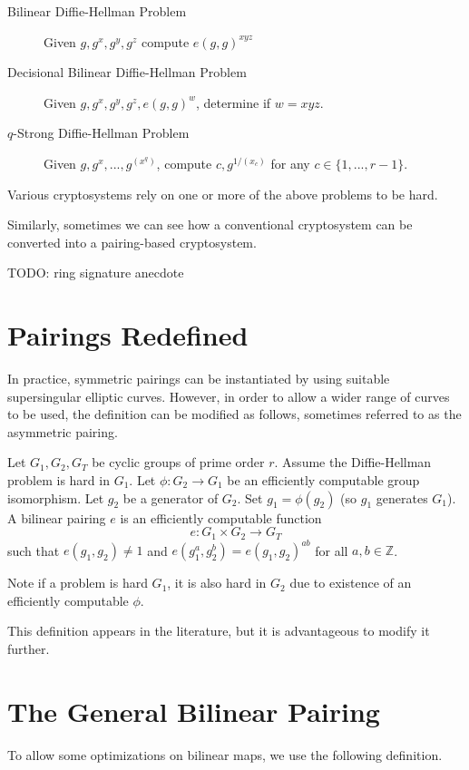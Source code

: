 \begin{description}
\item [Bilinear Diffie-Hellman Problem]
Given $g,g^x,g^y,g^z$ compute $e(g,g)^{xyz}$
\item [Decisional Bilinear Diffie-Hellman Problem]
Given $g,g^x,g^y,g^z,e(g,g)^w$, determine if $w = x y z$.
\item [$q$-Strong Diffie-Hellman Problem]
Given $g,g^x,...,g^{(x^q)}$, compute $c, g^{1/(x_c)}$
for any $c\in\{1,...,r-1\}$.
\end{description}

Various cryptosystems rely on one or more of the above problems to be
hard.

Similarly, sometimes we can see how a conventional cryptosystem
can be converted into a pairing-based cryptosystem.

TODO: ring signature anecdote

\section{Pairings Redefined}

In practice, symmetric pairings can be instantiated by
using suitable supersingular elliptic curves.
However, in order to allow a wider range of curves to be used,
the definition can be modified as follows, sometimes referred
to as the asymmetric pairing.

Let $G_1, G_2, G_T$ be cyclic groups of prime order $r$.
Assume the Diffie-Hellman problem is hard in $G_1$.
Let $\phi : G_2 \rightarrow G_1$ be an efficiently computable group
isomorphism. Let $g_2$ be a generator of $G_2$.
Set $g_1 = \phi(g_2)$ (so $g_1$ generates $G_1$). 
A bilinear pairing $e$ is an efficiently computable function
\[
e:G_1 \times G_2 \rightarrow G_T
\]
such that $e(g_1,g_2) \ne 1$ and
$e(g_1^a, g_2^b) = e(g_1,g_2)^{a b}$ for all $a, b \in \mathbb{Z}$.

Note if a problem is hard $G_1$, it is also hard in $G_2$
due to existence of an efficiently computable
$\phi$.

This definition appears in the literature, but it is advantageous
to modify it further.

\section{The General Bilinear Pairing}

To allow some optimizations on bilinear maps,
we use the following definition.

